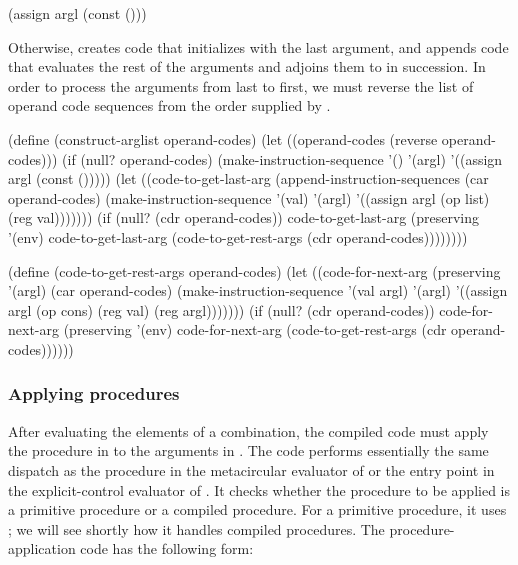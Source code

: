 \begin{codeBlock}
(assign argl (const ()))
\end{codeBlock}

\noindent
Otherwise,  creates code that initializes 
with the last argument, and appends code that evaluates the rest of the
arguments and adjoins them to  in succession.  In order to process
the arguments from last to first, we must reverse the list of operand code
sequences from the order supplied by .

\begin{codeBlock}
(define (construct-arglist operand-codes)
  (let ((operand-codes (reverse operand-codes)))
    (if (null? operand-codes)
        (make-instruction-sequence
          '() '(argl)
          '((assign argl (const ()))))
        (let ((code-to-get-last-arg
                (append-instruction-sequences
                  (car operand-codes)
                  (make-instruction-sequence
                    '(val) '(argl)
                    '((assign argl
                              (op list)
                              (reg val)))))))
          (if (null? (cdr operand-codes))
              code-to-get-last-arg
              (preserving
                '(env)
                code-to-get-last-arg
                (code-to-get-rest-args
                  (cdr operand-codes))))))))

(define (code-to-get-rest-args operand-codes)
  (let ((code-for-next-arg
          (preserving
            '(argl)
            (car operand-codes)
            (make-instruction-sequence
              '(val argl) '(argl)
              '((assign argl
                        (op cons)
                        (reg val)
                        (reg argl)))))))
    (if (null? (cdr operand-codes))
        code-for-next-arg
        (preserving
          '(env)
          code-for-next-arg
          (code-to-get-rest-args
            (cdr operand-codes))))))
\end{codeBlock}

\subsubsection*{Applying procedures}

After evaluating the elements of a combination, the compiled code must apply
the procedure in  to the arguments in .  The code
performs essentially the same dispatch as the  procedure in the
metacircular evaluator of  or the 
entry point in the explicit-control evaluator of .  It
checks whether the procedure to be applied is a primitive procedure or a
compiled procedure.  For a primitive procedure, it uses
; we will see shortly how it handles compiled
procedures.  The procedure-application code has the following form:

